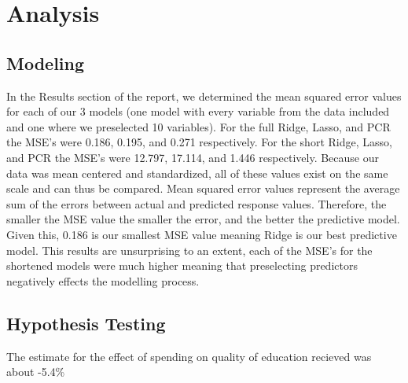 \documentclass{article}
\begin{document}

\maketitle


\section{Analysis}

\subsection{Modeling}
In the Results section of the report, we determined the mean squared error values for each of our 3 models (one model with every variable from the data included and one where we preselected 10 variables).  For the full Ridge, Lasso, and PCR the MSE's were 0.186, 0.195, and 0.271 respectively. For the short Ridge, Lasso, and PCR the MSE's were 12.797, 17.114, and 1.446 respectively. Because our data was mean centered and standardized, all of these values exist on the same scale and can thus be compared. Mean squared error values represent the average sum of the errors between actual and predicted response values. Therefore, the smaller the MSE value the smaller the error, and the better the predictive model.  Given this, 0.186 is our smallest MSE value meaning Ridge is our best predictive model. This results are unsurprising to an extent, each of the MSE's for the shortened models were much higher meaning that preselecting predictors negatively effects the modelling process.  

\subsection{Hypothesis Testing}
The estimate for the effect of spending on quality of education recieved was about -5.4\%\
\end{document}
